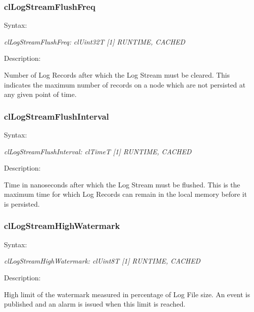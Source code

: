 \begin{flushleft}
\subsubsection{clLogStreamFlushFreq}
\begin{Desc}
\item[Syntax:]
\end{Desc}
\textit{clLogStreamFlushFreq: clUint32T [1] {RUNTIME, CACHED}}
\begin{Desc}
 \item[Description:]
\end{Desc}
Number of Log Records after which the Log Stream must be cleared. This indicates the maximum number of records on a node which are not persisted at any 
given point of time.



\subsubsection{clLogStreamFlushInterval}
\begin{Desc}
\item[Syntax:]
\end{Desc}
\textit{clLogStreamFlushInterval: clTimeT [1] {RUNTIME, CACHED}}
\begin{Desc}
 \item[Description:]
\end{Desc}
Time in nanoseconds after which the Log Stream must be flushed. This is the maximum time for which Log Records can remain in the local memory
before it is persisted.



\subsubsection{clLogStreamHighWatermark}
\begin{Desc}
\item[Syntax:]
\end{Desc}
\textit{clLogStreamHighWatermark: clUint8T [1] {RUNTIME, CACHED}}
\begin{Desc}
 \item[Description:]
\end{Desc}
High limit of the watermark measured in percentage of Log File size. An event is published and an alarm is issued when this limit is reached.




\end{flushleft}
